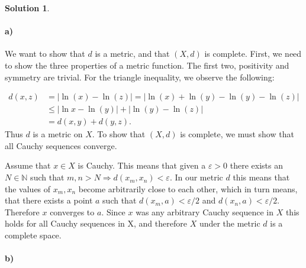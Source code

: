 \documentclass[a4paper]{article}
\theoremstyle{definition}
\newtheorem{sol}{Solution}
\begin{document}
\begin{sol}
\item\paragraph{a)}
We want to show that $d$ is a metric, and that $\left( X, d \right)$ is
complete.  First, we need to show the three properties of a metric function.
The first two, positivity and symmetry are trivial.  For the triangle
inequality, we observe the following:

\begin{align*}
  d(x, z) &= | \ln(x) - \ln(z)| = | \ln(x) + \ln(y) - \ln(y) - \ln(z) | \\
          &\leq |\ln x - \ln(y) | + |\ln(y) - \ln(z) | \\
          &= d(x, y) + d(y, z).
\end{align*}
Thus $d$ is a metric on $X$. To show that $\left( X, d \right)$ is complete, we
must show that all Cauchy sequences converge.

Assume that $x \in X$ is Cauchy. This means that given a $\varepsilon > 0$
there exists an $N \in \mathbb{N}$ such that $m, n > N \Longrightarrow d(x_m,
x_n) < \varepsilon$. In our metric $d$ this means that the values of $x_m, x_n$
become arbitrarily close to each other, which in turn means, that there exists
a point $a$ such that $d(x_m, a) < \varepsilon/2$ and $d(x_n, a) <
\varepsilon/2$. Therefore $x$ converges to $a$.  Since $x$ was any arbitrary
Cauchy sequence in $X$ this holds for all Cauchy sequences in X, and therefore
$X$ under the metric $d$ is a complete space. 

\paragraph{b)}


\end{sol}
\end{document}
